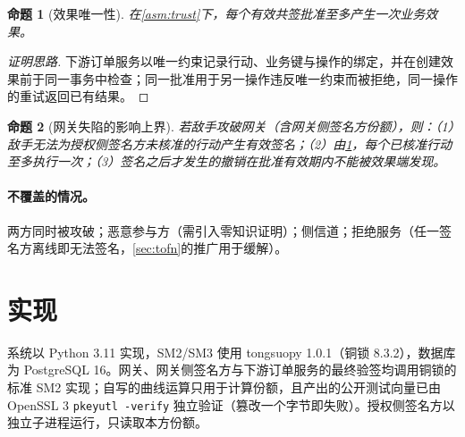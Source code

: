 \documentclass[UTF8,zihao=-4,a4paper]{ctexart}
\newif\ifshowguide
\newcommand{\guide}[1]{%
  \ifshowguide
  \begin{tcolorbox}[colback=gray!8,colframe=gray!45,boxrule=0.4pt,
      arc=1pt,left=4pt,right=4pt,top=2pt,bottom=2pt,fontupper=\small]
  \textbf{写作指引：}#1
  \end{tcolorbox}
  \fi}
\theoremstyle{plain}
\newtheorem{proposition}{命题}
\theoremstyle{definition}
\theoremstyle{remark}
\begin{document}
\begin{proposition}[效果唯一性]\label{prop:once}
在\cref{asm:trust}下，每个有效共签批准至多产生一次业务效果。
\end{proposition}
\begin{proof}[证明思路]
下游订单服务以唯一约束记录行动、业务键与操作的绑定，并在创建效果前于同一事务中检查；同一批准用于另一操作违反唯一约束而被拒绝，同一操作的重试返回已有结果。
\end{proof}

\begin{proposition}[网关失陷的影响上界]\label{prop:gateway}
若敌手攻破网关（含网关侧签名方份额），则：（1）敌手无法为授权侧签名方未核准的行动产生有效签名；（2）由\cref{prop:once}，每个已核准行动至多执行一次；（3）签名之后才发生的撤销在批准有效期内不能被效果端发现。
\end{proposition}
\guide{（3）是如实陈述的剩余风险，对应\cref{sec:freshness}的设计。不得写成“网关被攻破后任何订单都无法产生”。}

\guide{可选：用 ProVerif 或 Tamarin 对“委托—出份额—撤销—接受”流程建模，验证一条可达性性质（撤销后不存在被接受的新行动）。只有真正跑出结果才写，否则不写。不要写“已形式化证明安全”。}

\paragraph{不覆盖的情况。}两方同时被攻破；恶意参与方（需引入零知识证明）；侧信道；拒绝服务（任一签名方离线即无法签名，\cref{sec:tofn}的推广用于缓解）。

\section{实现}\label{sec:impl}

系统以 Python 3.11 实现，SM2/SM3 使用 tongsuopy 1.0.1（铜锁 8.3.2），数据库为 PostgreSQL 16。网关、网关侧签名方与下游订单服务的最终验签均调用铜锁的标准 SM2 实现；自写的曲线运算只用于计算份额，且产出的公开测试向量已由 OpenSSL 3 \texttt{pkeyutl -verify} 独立验证（篡改一个字节即失败）。授权侧签名方以独立子进程运行，只读取本方份额。
\end{document}

